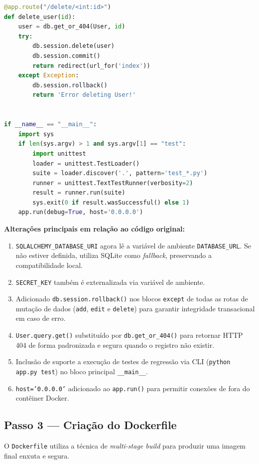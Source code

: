 \documentclass[12pt,a4paper]{article}
\begin{document}
\begin{lstlisting}[language=Python, caption={\texttt{app.py} — código refatorado com suporte a variáveis de ambiente e testes.}]
@app.route("/delete/<int:id>")
def delete_user(id):
    user = db.get_or_404(User, id)
    try:
        db.session.delete(user)
        db.session.commit()
        return redirect(url_for('index'))
    except Exception:
        db.session.rollback()
        return 'Error deleting User!'


if __name__ == "__main__":
    import sys
    if len(sys.argv) > 1 and sys.argv[1] == "test":
        import unittest
        loader = unittest.TestLoader()
        suite = loader.discover('.', pattern='test_*.py')
        runner = unittest.TextTestRunner(verbosity=2)
        result = runner.run(suite)
        sys.exit(0 if result.wasSuccessful() else 1)
    app.run(debug=True, host='0.0.0.0')
\end{lstlisting}

\textbf{Alterações principais em relação ao código original:}
\begin{enumerate}[nosep]
  \item \texttt{SQLALCHEMY\_DATABASE\_URI} agora lê a variável de ambiente
        \texttt{DATABASE\_URL}. Se não estiver definida, utiliza SQLite como
        \textit{fallback}, preservando a compatibilidade local.
  \item \texttt{SECRET\_KEY} também é externalizada via variável de ambiente.
  \item Adicionado \texttt{db.session.rollback()} nos blocos \texttt{except} de todas
        as rotas de mutação de dados (\texttt{add}, \texttt{edit} e \texttt{delete}) para
        garantir integridade transacional em caso de erro.
  \item \texttt{User.query.get()} substituído por \texttt{db.get\_or\_404()}
        para retornar HTTP 404 de forma padronizada e segura quando o registro não existir.
  \item Inclusão de suporte a execução de testes de regressão via CLI (\texttt{python app.py test})
        no bloco principal \texttt{\_\_main\_\_}.
  \item \texttt{host='0.0.0.0'} adicionado ao \texttt{app.run()} para permitir
        conexões de fora do contêiner Docker.
\end{enumerate}

\subsection{Passo 3 — Criação do Dockerfile}

O \texttt{Dockerfile} utiliza a técnica de \textit{multi-stage build} para produzir
uma imagem final enxuta e segura.
\end{document}
